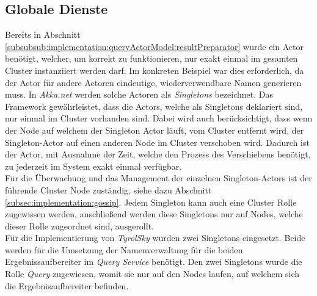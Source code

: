 \subsection{Globale Dienste}
\label{subsec:implementation:singeltons}
Bereits in Abschnitt \ref{subsubsub:implementation:queryActorModel:resultPreparator} wurde ein Actor benötigt, welcher, um korrekt zu funktionieren, nur exakt einmal im gesamten Cluster instanziiert werden darf. Im konkreten Beispiel war dies erforderlich, da der Actor für andere Actoren eindeutige, wiederverwendbare Namen generieren muss. In \textit{Akka.net} werden solche Actoren als \textit{Singletons} bezeichnet. Das Framework gewährleistet, dass die Actors, welche als Singletons deklariert sind, nur einmal im Cluster vorhanden sind. Dabei wird auch berücksichtigt, dass wenn der Node auf welchem der Singleton Actor läuft, vom Cluster entfernt wird, der Singleton-Actor auf einen anderen Node im Cluster verschoben wird. Dadurch ist der Actor, mit Ausnahme der Zeit, welche den Prozess des Verschiebens benötigt, zu jederzeit im System exakt einmal verfügbar. \\
% 
% 
Für die Überwachung und das Management der einzelnen Singleton-Actors ist der führende Cluster Node zuständig, siehe dazu Abschnitt \ref{subsec:implementation:gossip}. Jedem Singleton kann auch eine Cluster Rolle zugewissen werden, anschließend werden diese Singletons nur auf Nodes, welche dieser Rolle zugeordnet sind, ausgerollt. \\
Für die Implementierung von \textit{TyrolSky} wurden zwei Singletons eingesetzt. Beide werden für die Umsetzung der Namenverwaltung für die beiden Ergebnissaufbereiter im \textit{Query Service} benötigt.  Den zwei Singletons wurde die Rolle \textit{Query} zugewiesen,  womit sie nur auf den Nodes laufen, auf welchem sich die Ergebnisaufbereiter befinden.

